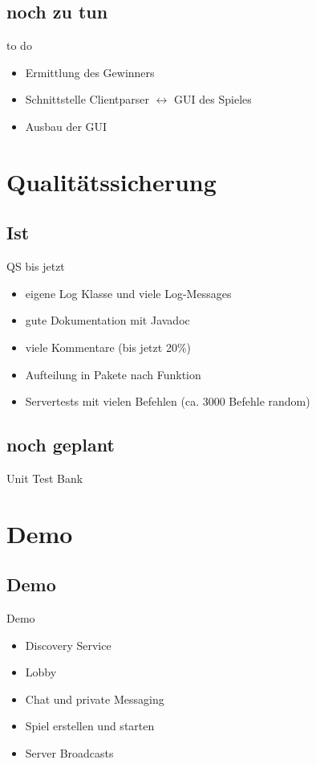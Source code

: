 \documentclass[12pt, utf8]{beamer}
\begin{document}
\subsection{noch zu tun} 
\begin{frame}{to do}
\begin{itemize}
\item Ermittlung des Gewinners
\item Schnittstelle Clientparser $\leftrightarrow$ GUI des Spieles
\item Ausbau der GUI
\end{itemize}
\end{frame}

\section{Qualitätssicherung}
\subsection{Ist}
\begin{frame}{QS bis jetzt}
\begin{itemize}
\item eigene Log Klasse und viele Log-Messages
\item gute Dokumentation mit Javadoc
\item viele Kommentare (bis jetzt 20\%)
\item Aufteilung in Pakete nach Funktion
\item Servertests mit vielen Befehlen (ca. 3000 Befehle random)
\end{itemize}
\end{frame}

\subsection{noch geplant}
\begin{frame}
	\begin{exampleblock}{Unit Test}
		Bank
	\end{exampleblock}
\end{frame}


\section{Demo}
\subsection{Demo}
\begin{frame}{Demo}
\begin{itemize}
\item Discovery Service
\item Lobby
\item Chat und private Messaging
\item Spiel erstellen und starten
\item Server Broadcasts
\end{itemize}
\end{frame}
\end{document}
